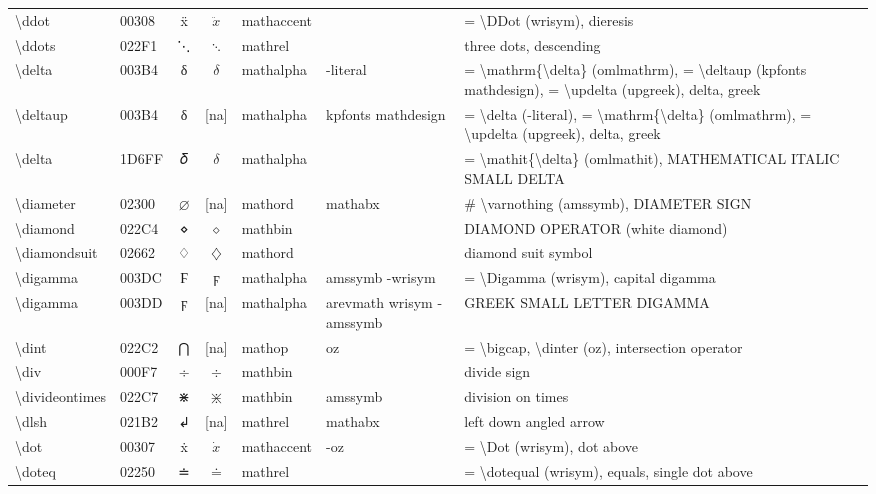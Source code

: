 \documentclass[a4paper,landscape]{article}
\begin{document}
\begin{longtable}{llcclll}
\textbackslash{}ddot & 00308 & ẍ & $\ddot{x}$ & mathaccent &  & = \textbackslash{}DDot (wrisym), dieresis \\
\textbackslash{}ddots & 022F1 & ⋱ & $\ddots$ & mathrel &  & three dots, descending \\
\textbackslash{}delta & 003B4 & δ & $\delta$ & mathalpha & -literal & = \textbackslash{}mathrm\{\textbackslash{}delta\} (omlmathrm), = \textbackslash{}deltaup (kpfonts mathdesign), = \textbackslash{}updelta (upgreek), delta, greek \\
\textbackslash{}deltaup & 003B4 & δ & [na] & mathalpha & kpfonts mathdesign & = \textbackslash{}delta (-literal), = \textbackslash{}mathrm\{\textbackslash{}delta\} (omlmathrm),  = \textbackslash{}updelta (upgreek),  delta,  greek \\
\textbackslash{}delta & 1D6FF & 𝛿 & $\delta$ & mathalpha &  & = \textbackslash{}mathit\{\textbackslash{}delta\} (omlmathit), MATHEMATICAL ITALIC SMALL DELTA \\
\textbackslash{}diameter & 02300 & ⌀ & [na] & mathord & mathabx & \# \textbackslash{}varnothing (amssymb), DIAMETER SIGN \\
\textbackslash{}diamond & 022C4 & ⋄ & $\diamond$ & mathbin &  & DIAMOND OPERATOR (white diamond) \\
\textbackslash{}diamondsuit & 02662 & ♢ & $\diamondsuit$ & mathord &  & diamond suit symbol \\
\textbackslash{}digamma & 003DC & Ϝ & $\digamma$ & mathalpha & amssymb -wrisym & = \textbackslash{}Digamma (wrisym), capital digamma \\
\textbackslash{}digamma & 003DD & ϝ & [na] & mathalpha & arevmath wrisym -amssymb & GREEK SMALL LETTER DIGAMMA \\
\textbackslash{}dint & 022C2 & ⋂ & [na] & mathop & oz & = \textbackslash{}bigcap,  \textbackslash{}dinter (oz),  intersection operator \\
\textbackslash{}div & 000F7 & ÷ & $\div$ & mathbin &  & divide sign \\
\textbackslash{}divideontimes & 022C7 & ⋇ & $\divideontimes$ & mathbin & amssymb & division on times \\
\textbackslash{}dlsh & 021B2 & ↲ & [na] & mathrel & mathabx & left down angled arrow \\
\textbackslash{}dot & 00307 & ẋ & $\dot{x}$ & mathaccent & -oz & = \textbackslash{}Dot (wrisym), dot above \\
\textbackslash{}doteq & 02250 & ≐ & $\doteq$ & mathrel &  & = \textbackslash{}dotequal (wrisym), equals, single dot above \\

\end{longtable}
\end{document}
